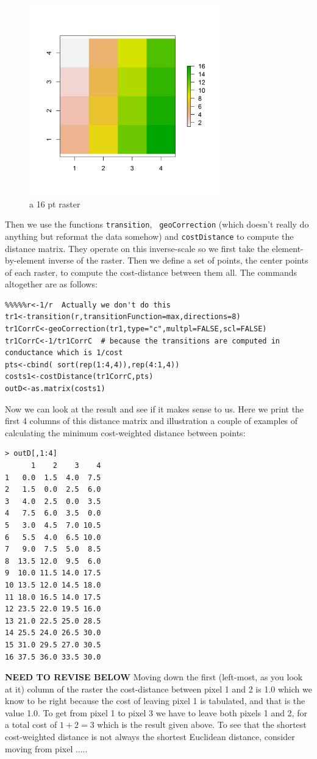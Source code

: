 \begin{figure}
\begin{center}
\includegraphics[height=3.25in,width=3.25in]{Ch10/figs/raster}
\end{center}
\caption{a 16 pt raster}
\label{ecoldist.fig.raster}
\end{figure}

Then we use the functions \mbox{\tt transition}, \mbox{\tt
  geoCorrection} (which doesn't really do anything but reformat the
data somehow) and \mbox{\tt costDistance} to compute the distance
matrix. They operate on this inverse-scale so we first take the element-by-element
inverse of the raster. Then we define a set of points,
the center points of each raster, to compute the cost-distance between
them all. The commands altogether are as follows:
\begin{verbatim}
%%%%%r<-1/r  Actually we don't do this
tr1<-transition(r,transitionFunction=max,directions=8)
tr1CorrC<-geoCorrection(tr1,type="c",multpl=FALSE,scl=FALSE)
tr1CorrC<-1/tr1CorrC  # because the transitions are computed in conductance which is 1/cost
pts<-cbind( sort(rep(1:4,4)),rep(4:1,4))
costs1<-costDistance(tr1CorrC,pts)
outD<-as.matrix(costs1)
\end{verbatim}
Now we can look at the result and see if it makes sense to us. Here we
print the first 4 columns of this distance matrix and illustration a
couple of examples of calculating the minimum cost-weighted distance
between points:
\small{
\begin{verbatim}
> outD[,1:4]
      1    2    3    4
1   0.0  1.5  4.0  7.5
2   1.5  0.0  2.5  6.0
3   4.0  2.5  0.0  3.5
4   7.5  6.0  3.5  0.0
5   3.0  4.5  7.0 10.5
6   5.5  4.0  6.5 10.0
7   9.0  7.5  5.0  8.5
8  13.5 12.0  9.5  6.0
9  10.0 11.5 14.0 17.5
10 13.5 12.0 14.5 18.0
11 18.0 16.5 14.0 17.5
12 23.5 22.0 19.5 16.0
13 21.0 22.5 25.0 28.5
14 25.5 24.0 26.5 30.0
15 31.0 29.5 27.0 30.5
16 37.5 36.0 33.5 30.0
\end{verbatim}
}
{\bf NEED TO REVISE BELOW}
Moving down the first (left-most, as you look at it) column of the
raster the cost-distance between pixel 1 and 2 is 1.0 which we know to
be right because the cost of leaving pixel 1 is tabulated, and that is
the value 1.0.  To get from pixel 1 to pixel 3 we have to leave both
pixels 1 and 2, for a total cost of $1+2 = 3$ which is the result
given above.  To see that the shortest cost-weighted distance is not always the
shortest Euclidean distance, consider moving from pixel .....


